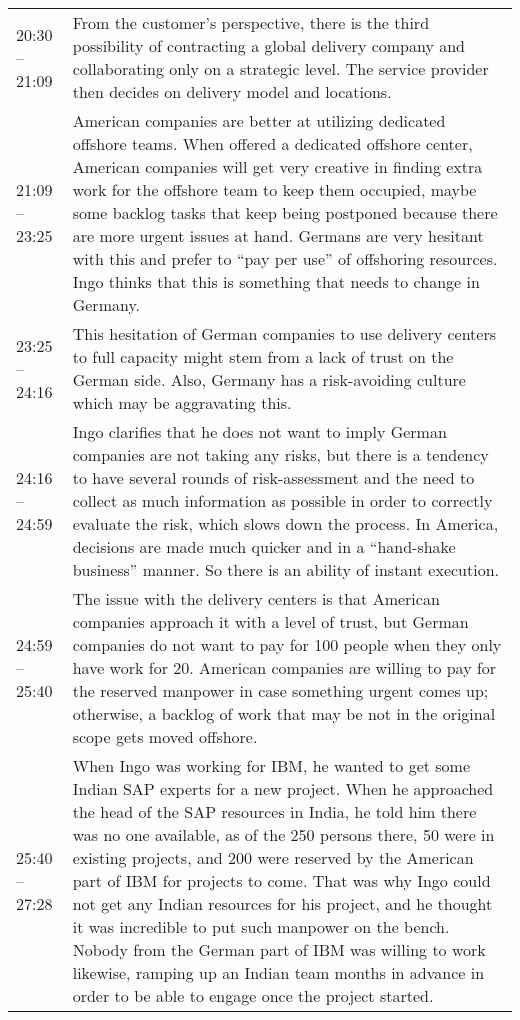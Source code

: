 \begin{appendix}
\begin{longtable}{l p{12.5cm}}
	20:30 -- 21:09& From the customer's perspective, there is the third possibility of contracting a global delivery company and collaborating only on a strategic level. The service provider then decides on delivery model and locations.\\
	21:09 -- 23:25& American companies are better at utilizing dedicated offshore teams. When offered a dedicated offshore center, American companies will get very creative in finding extra work for the offshore team to keep them occupied, maybe some backlog tasks that keep being postponed because there are more urgent issues at hand. Germans are very hesitant with this and prefer to ``pay per use'' of offshoring resources. Ingo thinks that this is something that needs to change in Germany.\\
	23:25 -- 24:16& This hesitation of German companies to use delivery centers to full capacity might stem from a lack of trust on the German side. Also, Germany has a risk-avoiding culture which may be aggravating this.\\
	24:16 -- 24:59&Ingo clarifies that he does not want to imply German companies are not taking any risks, but there is a tendency to have several rounds of risk-assessment and the need to collect as much information as possible in order to correctly evaluate the risk, which slows down the process. In America, decisions are made much quicker and in a ``hand-shake business'' manner. So there is an ability of instant execution.\\
	24:59 -- 25:40& The issue with the delivery centers is that American companies approach it with a level of trust, but German companies do not want to pay for 100 people when they only have work for 20. American companies are willing to pay for the reserved manpower in case something urgent comes up; otherwise, a backlog of work that may be not in the original scope gets moved offshore.\\
	25:40 -- 27:28& When Ingo was working for IBM, he wanted to get some Indian SAP experts for a new project. When he approached the head of the SAP resources in India, he told him there was no one available, as of the 250 persons there, 50 were in existing projects, and 200 were reserved by the American part of IBM for projects to come. That was why Ingo could not get any Indian resources for his project, and he thought it was incredible to put such manpower on the bench. Nobody from the German part of IBM was willing to work likewise, ramping up an Indian team months in advance in order to be able to engage once the project started.\\

\end{longtable}
\end{appendix}
